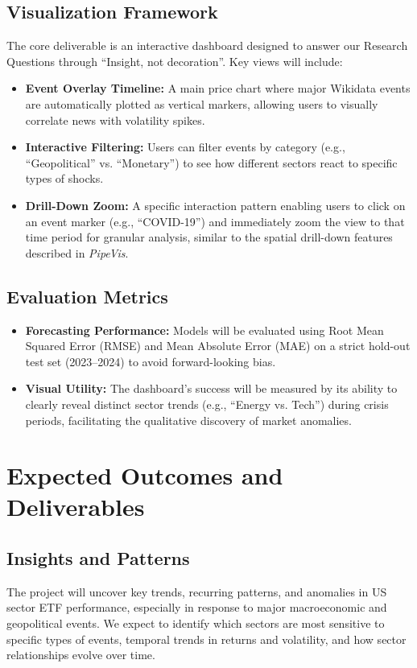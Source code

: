 \documentclass{article}
\begin{document}
\subsection{Visualization Framework}
The core deliverable is an interactive dashboard designed to answer our Research Questions through ``Insight, not decoration''. Key views will include:

\begin{itemize}
    \item \textbf{Event Overlay Timeline:} A main price chart where major Wikidata events are automatically plotted as vertical markers, allowing users to visually correlate news with volatility spikes.
    \item \textbf{Interactive Filtering:} Users can filter events by category (e.g., ``Geopolitical'' vs. ``Monetary'') to see how different sectors react to specific types of shocks.
    \item \textbf{Drill-Down Zoom:} A specific interaction pattern enabling users to click on an event marker (e.g., ``COVID-19'') and immediately zoom the view to that time period for granular analysis, similar to the spatial drill-down features described in \textit{PipeVis}.
\end{itemize}

\subsection{Evaluation Metrics}
\begin{itemize}
    \item \textbf{Forecasting Performance:} Models will be evaluated using Root Mean Squared Error (RMSE) and Mean Absolute Error (MAE) on a strict hold-out test set (2023–2024) to avoid forward-looking bias.
    \item \textbf{Visual Utility:} The dashboard's success will be measured by its ability to clearly reveal distinct sector trends (e.g., ``Energy vs. Tech'') during crisis periods, facilitating the qualitative discovery of market anomalies.
\end{itemize}


\section{Expected Outcomes and Deliverables}

\subsection{Insights and Patterns}
The project will uncover key trends, recurring patterns, and anomalies in US sector ETF performance, especially in response to major macroeconomic and geopolitical events. We expect to identify which sectors are most sensitive to specific types of events, temporal trends in returns and volatility, and how sector relationships evolve over time.
\end{document}

